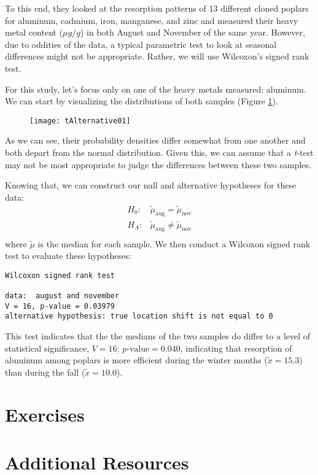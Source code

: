 To this end, they looked at the resorption patterns of 13 different cloned poplars for aluminum, cadmium, iron, manganese, and zinc and measured their heavy metal content ($\mu g/g$) in both August and November of the same year. However, due to oddities of the data, a typical parametric test to look at seasonal differences might not be appropriate. Rather, we will use Wilcoxon's signed rank test.

For this study, let's focus only on one of the heavy metals measured: aluminum. We can start by visualizing the distributions of both samples (Figure \ref{fig:tAlt01}).

\begin{figure}[htp]
\texttt{[image: tAlternative01]}
\caption{}
\label{fig:tAlt01}
\end{figure}

As we can see, their probability densities differ somewhat from one another and both depart from the normal distribution. Given this, we can assume that a \textit{t}-test may not be most appropriate to judge the differences between these two samples.

Knowing that, we can construct our null and alternative hypotheses for these data:
\begin{eqnarray*}
H_0:& \tilde{\mu}_{\text{aug}} = \tilde{\mu}_{\text{nov}} \\
H_A:&  \tilde{\mu}_{\text{aug}} \neq \tilde{\mu}_{\text{nov}} \\
\end{eqnarray*}
where $\tilde{\mu}$ is the median for each sample. We then conduct a Wilcoxon signed rank test to evaluate these hypotheses:

\begin{framed}
\begin{Verbatim}[samepage=TRUE]
	Wilcoxon signed rank test

data:  august and november
V = 16, p-value = 0.03979
alternative hypothesis: true location shift is not equal to 0
\end{Verbatim}
\end{framed}

This test indicates that the the medians of the two samples do differ to a level of statistical significance, $V = 16$; $p\text{-value}=0.040$, indicating that resorption of aluminum among poplars is more efficient during the winter months ($\tilde{x}=15.3$) than during the fall ($\tilde{x}=10.0$).

\section{Exercises}

\section{Additional Resources}

